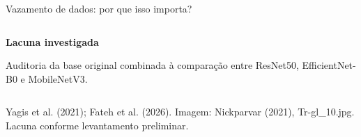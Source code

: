 \documentclass[aspectratio=169,11pt,t]{beamer}
\def\kickertext{}
\newcommand{\kicker}[1]{\gdef\kickertext{#1}}
\newcommand{\source}[1]{\par\vfill{\fontsize{6.5}{7.8}\selectfont\color{muted}#1\par}\vspace{1mm}}
\begin{document}
\begin{frame}{Vazamento de dados: por que isso importa?}
\begin{columns}[T,onlytextwidth]
\vspace{1.5mm}
\raggedright
\begin{tcolorbox}[tint]
{\scriptsize\bfseries\color{teal}Lacuna investigada\par}
\vspace{0.5mm}
{\footnotesize Auditoria da base original combinada à comparação entre ResNet50, EfficientNet-B0 e MobileNetV3.\par}
\end{tcolorbox}
\end{columns}
\source{Yagis et al. (2021); Fateh et al. (2026). Imagem: Nickparvar (2021), Tr-gl\_10.jpg. Lacuna conforme levantamento preliminar.}
\end{frame}

\kicker{03\enspace PROPOSTA}
\end{document}
